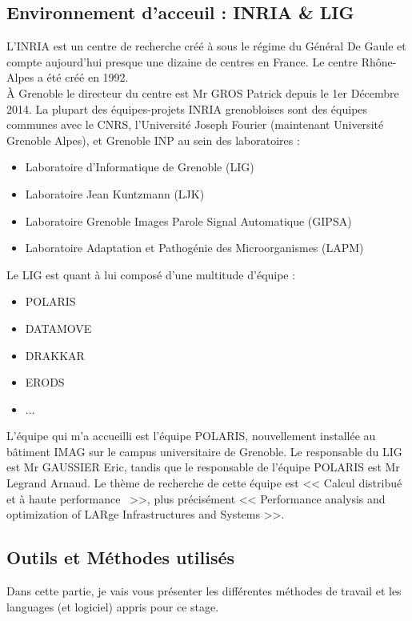 \documentclass[a4paper,12pt]{article}
\begin{document}
{	\subsection{Environnement d'acceuil : INRIA \& LIG}
	\indent L’INRIA est un centre de recherche cr\'e{}\'e{} \`a sous le r\'e{}gime du G\'e{}n\'e{}ral De Gaule et compte aujourd’hui presque une dizaine de centres en France. Le centre Rh\^one-Alpes a \'e{}t\'e{} cr\'e{}\'e{} en 1992.\\
	\indent \`A Grenoble le directeur du centre est Mr GROS Patrick depuis le 1er D\'e{}cembre 2014. La plupart des \'e{}quipes-projets INRIA grenobloises sont des \'e{}quipes communes avec le CNRS, l’Universit\'e{} Joseph Fourier (maintenant Universit\'e{} Grenoble Alpes), et Grenoble INP au sein des laboratoires :
    \begin{itemize}
        \item Laboratoire d’Informatique de Grenoble (LIG)
        \item Laboratoire Jean Kuntzmann (LJK)
        \item Laboratoire Grenoble Images Parole Signal Automatique (GIPSA)
        \item Laboratoire Adaptation et Pathog\'e{}nie des Microorganismes (LAPM)
    \end{itemize}
    Le LIG est quant \`a lui compos\'e d'une multitude d'\'e{}quipe :
    \begin{itemize}
        \item POLARIS
        \item DATAMOVE
        \item DRAKKAR
        \item ERODS
        \item ...
    \end{itemize}
	\indent \indent L'\'e{}quipe qui m'a accueilli est l'\'e{}quipe POLARIS, nouvellement install\'e{}e au b\^atiment IMAG sur le campus universitaire de Grenoble. Le responsable du LIG est Mr GAUSSIER Eric, tandis que le responsable de l'\'e{}quipe POLARIS est Mr Legrand Arnaud. Le thème de recherche de cette \'e{}quipe est << Calcul distribu\'e et \`a haute performance~ >>, plus pr\'e{}cis\'e{}ment << Performance analysis and optimization of LARge Infrastructures and Systems >>.
	\subsection{Outils et M\'e{}thodes utilis\'e{}s}
	\indent Dans cette partie, je vais vous pr\'e{}senter les diff\'e{}rentes m\'e{}thodes de travail et les languages (et logiciel) appris pour ce stage.
}
\end{document}
